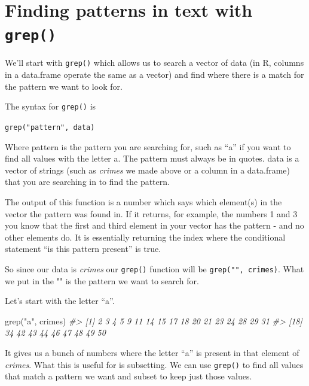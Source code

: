 \documentclass[
]{krantz}
\makeatletter
\newenvironment{Shaded}{\begin{snugshade}}{\end{snugshade}}
\newcommand{\CommentTok}[1]{\textcolor[rgb]{0.37,0.37,0.37}{\textit{#1}}}
\newcommand{\FunctionTok}[1]{\textcolor[rgb]{0,0,0}{#1}}
\newcommand{\NormalTok}[1]{#1}
\newcommand{\StringTok}[1]{\textcolor[rgb]{0.5,0.5,0.5}{#1}}
\newenvironment{kframe}{%
\medskip{}
\setlength{\fboxsep}{.8em}
 \def\at@end@of@kframe{}%
 \ifinner\ifhmode%
  \def\at@end@of@kframe{\end{minipage}}%
  \begin{minipage}{\columnwidth}%
 \fi\fi%
 \def\FrameCommand##1{\hskip\@totalleftmargin \hskip-\fboxsep
 \colorbox{shadecolor}{##1}\hskip-\fboxsep
     \hskip-\linewidth \hskip-\@totalleftmargin \hskip\columnwidth}%
 \MakeFramed {\advance\hsize-\width
   \@totalleftmargin\z@ \linewidth\hsize
   \@setminipage}}%
 {\par\unskip\endMakeFramed%
 \at@end@of@kframe}
\renewenvironment{Shaded}{\begin{kframe}}{\end{kframe}}
\makeatother
\begin{document}
\hypertarget{finding-patterns-in-text-with-grep}{%
\section{\texorpdfstring{Finding patterns in text with \texttt{grep()}}{Finding patterns in text with grep()}}\label{finding-patterns-in-text-with-grep}}

We'll start with \texttt{grep()} which allows us to search a vector of data (in R, columns in a data.frame operate the same as a vector) and find where there is a match for the pattern we want to look for.

The syntax for \texttt{grep()} is

\texttt{grep("pattern",\ data)}

Where pattern is the pattern you are searching for, such as ``a'' if you want to find all values with the letter a. The pattern must always be in quotes. data is a vector of strings (such as \emph{crimes} we made above or a column in a data.frame) that you are searching in to find the pattern.

The output of this function is a number which says which element(s) in the vector the pattern was found in. If it returns, for example, the numbers 1 and 3 you know that the first and third element in your vector has the pattern - and no other elements do. It is essentially returning the index where the conditional statement ``is this pattern present'' is true.

So since our data is \emph{crimes} our \texttt{grep()} function will be \texttt{grep("",\ crimes)}. What we put in the "" is the pattern we want to search for.

Let's start with the letter ``a''.

\begin{Shaded}
\begin{Highlighting}[]
\FunctionTok{grep}\NormalTok{(}\StringTok{"a"}\NormalTok{, crimes)}
\CommentTok{\#\textgreater{}  [1]  2  3  4  5  9 11 14 15 17 18 20 21 23 24 28 29 31}
\CommentTok{\#\textgreater{} [18] 34 42 43 44 46 47 48 49 50}
\end{Highlighting}
\end{Shaded}

It gives us a bunch of numbers where the letter ``a'' is present in that element of \emph{crimes}. What this is useful for is subsetting. We can use \texttt{grep()} to find all values that match a pattern we want and subset to keep just those values.
\end{document}
